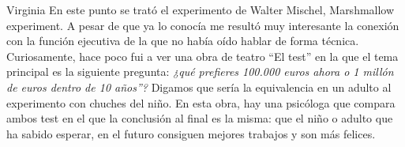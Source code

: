 \begin{opin}{\virgicolor}{Virginia}
En este punto se trató el experimento de Walter Mischel, Marshmallow experiment. A pesar de que ya lo conocía me resultó muy interesante la conexión con la función ejecutiva de la que no había oído hablar de forma técnica. Curiosamente, hace poco fui a ver una obra de teatro “El test” en la que el tema principal es la siguiente pregunta: \textit{¿qué prefieres 100.000 euros ahora o 1 millón de euros dentro de 10 años”?} Digamos que sería la equivalencia en un adulto al experimento con chuches del niño. En esta obra, hay una psicóloga que compara ambos test en el que la conclusión al final es la misma: que el niño o adulto que ha sabido esperar, en el futuro consiguen mejores trabajos y son más felices.




\end{opin}
